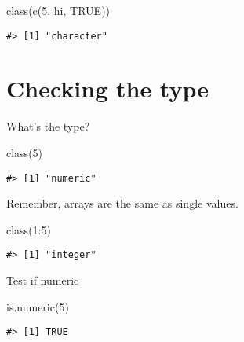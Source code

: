 \documentclass[
]{book}
\newenvironment{Shaded}{\begin{snugshade}}{\end{snugshade}}
\newcommand{\ConstantTok}[1]{\textcolor[rgb]{0.00,0.00,0.00}{#1}}
\newcommand{\DecValTok}[1]{\textcolor[rgb]{0.00,0.00,0.81}{#1}}
\newcommand{\FunctionTok}[1]{\textcolor[rgb]{0.00,0.00,0.00}{#1}}
\newcommand{\NormalTok}[1]{#1}
\newcommand{\SpecialCharTok}[1]{\textcolor[rgb]{0.00,0.00,0.00}{#1}}
\newcommand{\StringTok}[1]{\textcolor[rgb]{0.31,0.60,0.02}{#1}}
\begin{document}
\begin{Shaded}
\begin{Highlighting}[]
\FunctionTok{class}\NormalTok{(}\FunctionTok{c}\NormalTok{(}\DecValTok{5}\NormalTok{, }\StringTok{\textquotesingle{}hi\textquotesingle{}}\NormalTok{, }\ConstantTok{TRUE}\NormalTok{))}
\end{Highlighting}
\end{Shaded}

\begin{verbatim}
#> [1] "character"
\end{verbatim}

\hypertarget{checking-the-type}{%
\section{Checking the type}\label{checking-the-type}}

What's the type?

\begin{Shaded}
\begin{Highlighting}[]
\FunctionTok{class}\NormalTok{(}\DecValTok{5}\NormalTok{)}
\end{Highlighting}
\end{Shaded}

\begin{verbatim}
#> [1] "numeric"
\end{verbatim}

Remember, arrays are the same as single values.

\begin{Shaded}
\begin{Highlighting}[]
\FunctionTok{class}\NormalTok{(}\DecValTok{1}\SpecialCharTok{:}\DecValTok{5}\NormalTok{)}
\end{Highlighting}
\end{Shaded}

\begin{verbatim}
#> [1] "integer"
\end{verbatim}

Test if numeric

\begin{Shaded}
\begin{Highlighting}[]
\FunctionTok{is.numeric}\NormalTok{(}\DecValTok{5}\NormalTok{)}
\end{Highlighting}
\end{Shaded}

\begin{verbatim}
#> [1] TRUE
\end{verbatim}
\end{document}
